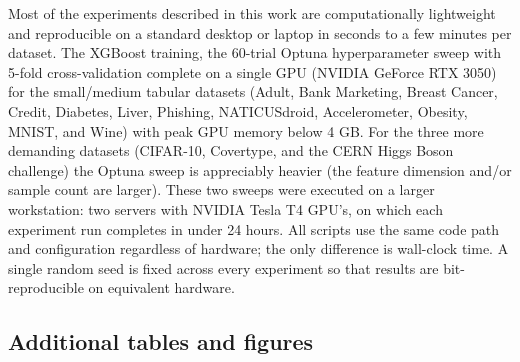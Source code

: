 \documentclass{article}
\theoremstyle{plain}
\theoremstyle{definition}
\theoremstyle{remark}
\begin{document}
Most of the experiments described in this work are computationally lightweight and reproducible on a standard desktop or laptop in seconds to a few minutes per dataset. The XGBoost training, the 60-trial Optuna hyperparameter sweep with 5-fold cross-validation complete on a single GPU (NVIDIA GeForce RTX 3050) for the small/medium tabular datasets (Adult, Bank Marketing, Breast Cancer, Credit, Diabetes, Liver, Phishing, NATICUSdroid, Accelerometer, Obesity, MNIST, and Wine) with peak GPU memory below 4 GB.  For the three more demanding datasets (CIFAR-10, Covertype, and the CERN Higgs Boson challenge) the Optuna sweep is appreciably heavier (the feature dimension and/or sample count are larger). These two sweeps were executed on a larger workstation: two servers with NVIDIA Tesla T4 GPU's, on which each experiment run completes in under 24 hours. All scripts use the same code path and configuration regardless of hardware; the only difference is wall-clock time. A single random seed is fixed across every experiment so that results are bit-reproducible on equivalent hardware.



\subsection{Additional tables and figures} \label{app:alt_tables}
\end{document}
